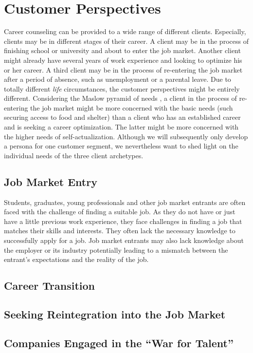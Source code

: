 \section{Customer Perspectives}
\label{sec:customer_perspective}

Career counseling can be provided to a wide range of different clients. Especially, clients may be
in different stages of their career. A client may be in the process of finishing school or university
and about to enter the job market. Another client might already have several years of work experience
and looking to optimize his or her career. A third client may be in the process of re-entering the job
market after a period of absence, such as unemployment or a parental leave. Due to totally different
\textit{life} circumstances, the customer perspectives might be entirely different. Considering the
Maslow pyramid of needs \citep{maslowTheoryHumanMotivation1943}, a client in the process of re-entering
the job market might be more concerned with the basic needs (such securing access to food and shelter)
than a client who has an established career and is seeking a career optimization. The latter might be
more concerned with the higher needs of self-actualization. Although we will subsequently only develop
a persona for one customer segment, we nevertheless want to shed light on the individual needs of the
three client archetypes.

\subsection{Job Market Entry}

Students, graduates, young professionals and other job market entrants are often faced with the
challenge of finding a suitable job. As they do not have or just have a little previous work experience,
they face challenges in finding a job that matches their skills and interests. They often lack the necessary
knowledge to successfully apply for a job. Job market entrants may also lack knowledge about the employer
or its industry potentially leading to a mismatch between the entrant's expectations and the reality of the
job.

\subsection{Career Transition}

\subsection{Seeking Reintegration into the Job Market}

\subsection{Companies Engaged in the ``War for Talent''}